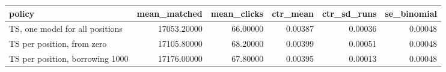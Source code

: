 \begin{tabular}{lrrrrr}
\toprule
policy & mean\_matched & mean\_clicks & ctr\_mean & ctr\_sd\_runs & se\_binomial \\
\midrule
TS, one model for all positions & 17053.20000 & 66.00000 & 0.00387 & 0.00036 & 0.00048 \\
TS per position, from zero & 17105.80000 & 68.20000 & 0.00399 & 0.00051 & 0.00048 \\
TS per position, borrowing 1000 & 17176.00000 & 67.80000 & 0.00395 & 0.00013 & 0.00048 \\
\bottomrule
\end{tabular}
